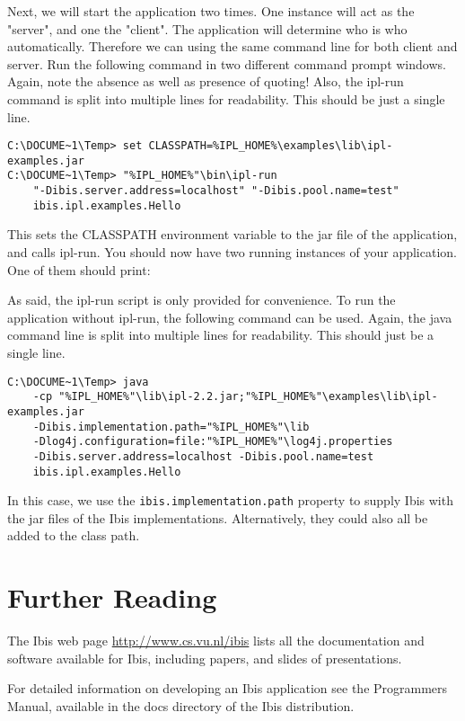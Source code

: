 \documentclass[a4paper,10pt]{article}
\begin{document}
Next, we will start the application two times. One instance will act as the
"server", and one the "client". The application will determine who is who
automatically. Therefore we can using the same command line for both client 
and server. Run the following command in two different command prompt windows.
Again, note the absence as well as presence of quoting! Also, the ipl-run
command is split into multiple lines for readability. This should be just a single
line.

\noindent
{\small
\begin{verbatim}
C:\DOCUME~1\Temp> set CLASSPATH=%IPL_HOME%\examples\lib\ipl-examples.jar
C:\DOCUME~1\Temp> "%IPL_HOME%"\bin\ipl-run
    "-Dibis.server.address=localhost" "-Dibis.pool.name=test"
    ibis.ipl.examples.Hello
\end{verbatim}
}
\noindent

This sets the CLASSPATH environment variable to the jar file of the
application, and calls ipl-run. You should now have two running
instances of your application. One of them should print:

 \noindent 

As said, the ipl-run script is only provided for convenience. To run
the application without ipl-run, the following command can be used.
Again, the java command line is split into multiple lines for readability.
This should just be a single line.

\noindent
{\small
\begin{verbatim}
C:\DOCUME~1\Temp> java
    -cp "%IPL_HOME%"\lib\ipl-2.2.jar;"%IPL_HOME%"\examples\lib\ipl-examples.jar
    -Dibis.implementation.path="%IPL_HOME%"\lib
    -Dlog4j.configuration=file:"%IPL_HOME%"\log4j.properties
    -Dibis.server.address=localhost -Dibis.pool.name=test
    ibis.ipl.examples.Hello
\end{verbatim}
}
\noindent

In this case, we use the \texttt{ibis.implementation.path} property to supply Ibis
with the jar files of the Ibis implementations. Alternatively, they
could also all be added to the class path.

\section{Further Reading}

The Ibis web page \url{http://www.cs.vu.nl/ibis} lists all
the documentation and software available for Ibis, including papers, and
slides of presentations.

For detailed information on developing an Ibis application see the
Programmers Manual, available in the docs directory of the Ibis
distribution.
\end{document}
